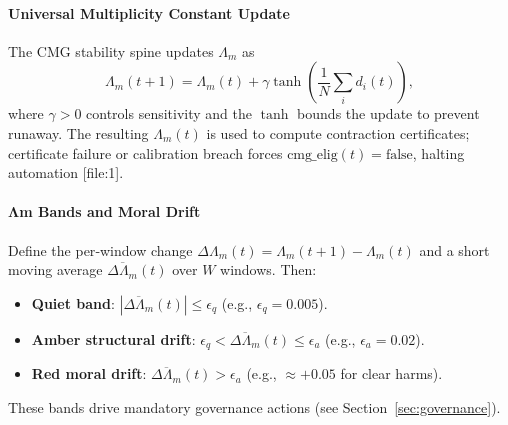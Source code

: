 \documentclass[11pt]{article}
\begin{document}
\paragraph{Universal Multiplicity Constant Update}
The CMG stability spine updates $\Lambda_m$ as
\begin{equation}
  \Lambda_m(t+1) = \Lambda_m(t) + \gamma \tanh\!\left( \frac{1}{N}\sum_{i} d_i(t) \right),
\end{equation}
where $\gamma>0$ controls sensitivity and the $\tanh$ bounds the update to prevent runaway. The resulting $\Lambda_m(t)$ is used to compute contraction certificates; certificate failure or calibration breach forces $\text{cmg\_elig}(t)=\text{false}$, halting automation {[file:1]}.

\paragraph{Λm Bands and Moral Drift}
Define the per‑window change $\Delta\Lambda_m(t)=\Lambda_m(t+1)-\Lambda_m(t)$ and a short moving average $\overline{\Delta\Lambda_m}(t)$ over $W$ windows. Then:
\begin{itemize}
  \item \textbf{Quiet band}: $|\overline{\Delta\Lambda_m}(t)|\le\epsilon_q$ (e.g., $\epsilon_q=0.005$).
  \item \textbf{Amber structural drift}: $\epsilon_q < \overline{\Delta\Lambda_m}(t) \le \epsilon_a$ (e.g., $\epsilon_a=0.02$).
  \item \textbf{Red moral drift}: $\overline{\Delta\Lambda_m}(t) > \epsilon_a$ (e.g., $\approx+0.05$ for clear harms).
\end{itemize}
These bands drive mandatory governance actions (see Section~\ref{sec:governance}).
\end{document}
